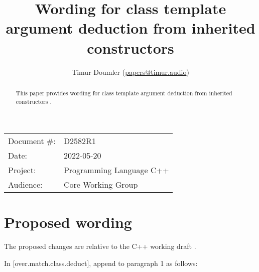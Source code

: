 

\newcommand{\forceindent}{\parindent=1em\indent\parindent=0pt\relax} %



\title{Wording for class template argument deduction from inherited constructors}
\author{
  Timur Doumler \small(\href{mailto:papers@timur.audio}{papers@timur.audio})
}
\date{}
\maketitle

\begin{tabular}{ll}
Document \#: & D2582R1 \\
Date: & 2022-05-20\\
Project: & Programming Language C++ \\
Audience: & Core Working Group
\end{tabular}


\begin{abstract}
This paper provides wording for class template argument deduction from inherited constructors \cite{P1021R6}.
\end{abstract}

\section{Proposed wording}

The proposed changes are relative to the C++ working draft \cite{N4910}. 

In [over.match.class.deduct], append to paragraph 1 as follows:

